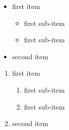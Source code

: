 \documentclass{article}
\begin{document}
\begin{itemize}
  \item first item
  \begin{itemize}
    \item first sub-item
    \item first sub-item
  \end{itemize}
  \item second item
\end{itemize}
\begin{enumerate}
  \item first item
  \begin{enumerate}
    \item first sub-item
    \item first sub-item
  \end{enumerate}
  \item second item
\end{enumerate}
\end{document}
